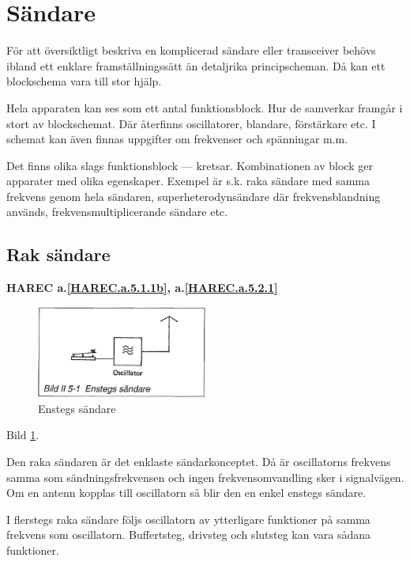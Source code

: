 \section{Sändare}
\label{sändare}

För att översiktligt beskriva en komplicerad sändare eller transceiver
behövs ibland ett enklare framställningssätt än detaljrika
principscheman. Då kan ett blockschema vara till stor hjälp.

Hela apparaten kan ses som ett antal funktionsblock. Hur de samverkar
framgår i stort av blockschemat. Där återfinns oscillatorer, blandare,
förstärkare etc. I schemat kan även finnas uppgifter om frekvenser och
spänningar m.m.

Det finns olika slags funktionsblock --- kretsar. Kombinationen av block
ger apparater med olika egenskaper. Exempel är s.k. raka sändare med
samma frekvens genom hela sändaren, superheterodynsändare där
frekvensblandning används, frekvensmultiplicerande sändare etc.

\subsection{Rak sändare}
\textbf{
HAREC a.\ref{HAREC.a.5.1.1b}\label{myHAREC.a.5.1.1b},
 a.\ref{HAREC.a.5.2.1}\label{myHAREC.a.5.2.1}
}

\begin{figure}
  \includegraphics[width=0.5\textwidth]{images/bild_2_5-01}
  \caption{Enstegs sändare}
  \label{fig:bildII5-1}
\end{figure}

Bild \ref{fig:bildII5-1}.

Den raka sändaren är det enklaste sändarkonceptet. Då är oscillatorns
frekvens samma som sändningsfrekvensen och ingen frekvensomvandling
sker i signalvägen. Om en antenn kopplas till oscillatorn så blir den
en enkel enstegs sändare.

I flerstegs raka sändare följs oscillatorn av ytterligare funktioner
på samma frekvens som oscillatorn. Buffertsteg, drivsteg och slutsteg
kan vara sådana funktioner.

